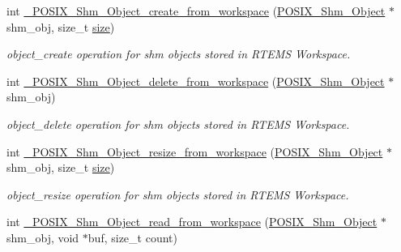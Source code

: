 \begin{DoxyCompactItemize}
\item 
\mbox{\label{group__POSIXShmPrivate_ga3c588a0b92cf32b64dca7f15b4caedd4}} 
int \mbox{\hyperlink{group__POSIXShmPrivate_ga3c588a0b92cf32b64dca7f15b4caedd4}{\+\_\+\+P\+O\+S\+I\+X\+\_\+\+Shm\+\_\+\+Object\+\_\+create\+\_\+from\+\_\+workspace}} (\mbox{\hyperlink{structPOSIX__Shm__Object}{P\+O\+S\+I\+X\+\_\+\+Shm\+\_\+\+Object}} $\ast$shm\+\_\+obj, size\+\_\+t \mbox{\hyperlink{sun4u_2tte_8h_a245260f6f74972558f61b85227df5aae}{size}})
\begin{DoxyCompactList}\small\item\em object\+\_\+create operation for shm objects stored in R\+T\+E\+MS Workspace. \end{DoxyCompactList}\item 
\mbox{\label{group__POSIXShmPrivate_ga8fa5e0cd45080a255de7fa174fa6fa8c}} 
int \mbox{\hyperlink{group__POSIXShmPrivate_ga8fa5e0cd45080a255de7fa174fa6fa8c}{\+\_\+\+P\+O\+S\+I\+X\+\_\+\+Shm\+\_\+\+Object\+\_\+delete\+\_\+from\+\_\+workspace}} (\mbox{\hyperlink{structPOSIX__Shm__Object}{P\+O\+S\+I\+X\+\_\+\+Shm\+\_\+\+Object}} $\ast$shm\+\_\+obj)
\begin{DoxyCompactList}\small\item\em object\+\_\+delete operation for shm objects stored in R\+T\+E\+MS Workspace. \end{DoxyCompactList}\item 
\mbox{\label{group__POSIXShmPrivate_gaa01bbb91f3e013bb50e38c0773fb57e1}} 
int \mbox{\hyperlink{group__POSIXShmPrivate_gaa01bbb91f3e013bb50e38c0773fb57e1}{\+\_\+\+P\+O\+S\+I\+X\+\_\+\+Shm\+\_\+\+Object\+\_\+resize\+\_\+from\+\_\+workspace}} (\mbox{\hyperlink{structPOSIX__Shm__Object}{P\+O\+S\+I\+X\+\_\+\+Shm\+\_\+\+Object}} $\ast$shm\+\_\+obj, size\+\_\+t \mbox{\hyperlink{sun4u_2tte_8h_a245260f6f74972558f61b85227df5aae}{size}})
\begin{DoxyCompactList}\small\item\em object\+\_\+resize operation for shm objects stored in R\+T\+E\+MS Workspace. \end{DoxyCompactList}\item 
\mbox{\label{group__POSIXShmPrivate_ga544cf403538b3d444628e8131d93ce43}} 
int \mbox{\hyperlink{group__POSIXShmPrivate_ga544cf403538b3d444628e8131d93ce43}{\+\_\+\+P\+O\+S\+I\+X\+\_\+\+Shm\+\_\+\+Object\+\_\+read\+\_\+from\+\_\+workspace}} (\mbox{\hyperlink{structPOSIX__Shm__Object}{P\+O\+S\+I\+X\+\_\+\+Shm\+\_\+\+Object}} $\ast$shm\+\_\+obj, void $\ast$buf, size\+\_\+t count)

\end{DoxyCompactItemize}
